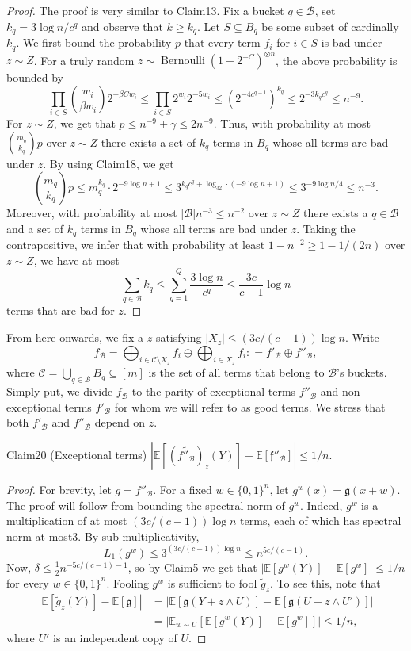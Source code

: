 \begin{proof}
The proof is very similar to Claim13. Fix a bucket $q\in\mathcal B$, set $k_q=3\log n/c^q$ and observe that $k\ge k_q$. Let $S\subseteq B_q$ be some subset of cardinally $k_q$. We first bound the probability $p$ that every term $f_i$ for $i\in S$ is bad under $z\sim Z$.
For a truly random $z\sim\operatorname{Bernoulli}(1-2^{-C})^{\otimes n}$, the above probability is bounded by
\[
\prod_{i\in S}\binom{w_i}{\beta w_i}2^{-\beta Cw_i}
\le\prod_{i\in S}2^{w_i}2^{-5w_i}
\le(2^{-4c^{q-1}})^{k_q}
\le2^{-3k_qc^q}\le n^{-9}.
\]
For $z\sim Z$, we get that $p\le n^{-9}+\gamma\le2n^{-9}$. Thus, with probability at most $\binom{m_q}{k_q}p$ over $z\sim Z$ there exists a set of $k_q$ terms in $B_q$ whose all terms are bad under $z$. By using Claim18, we get
\[
\binom{m_q}{k_q}p\le m_q^{k_q}\cdot2^{-9\log n+1}
\le3^{k_qc^q+\log_32\cdot(-9\log n+1)}
\le3^{-9\log n/4}\le n^{-3}.
\]
Moreover, with probability at most $|\mathcal B|n^{-3}\le n^{-2}$ over $z\sim Z$ there exists a $q\in\mathcal B$ and a set of $k_q$ terms in $B_q$ whose all terms are bad under $z$. Taking the contrapositive, we infer that with probability at least $1-n^{-2}\ge1-1/(2n)$ over $z\sim Z$, we have at most
\[
\sum_{q\in\mathcal B}k_q\le\sum_{q=1}^Q\frac{3\log n}{c^q}\le\frac{3c}{c-1}\log n
\]
terms that are bad for $z$.
\end{proof}
From here onwards, we fix a $z$ satisfying $|X_z|\le(3c/(c-1))\log n$. Write
\[
f_{\mathcal B}=\bigoplus_{i\in\mathcal C\setminus X_z}f_i\oplus\bigoplus_{i\in X_z}f_i
\mathrel{\mathop:}=f'_{\mathcal B}\oplus f''_{\mathcal B},
\]
where $\mathcal C=\bigcup_{q\in\mathcal B}B_q\subseteq[m]$ is the set of all terms that belong to $\mathcal B$'s buckets. Simply put, we divide $f_{\mathcal B}$ to the parity of exceptional terms $f''_{\mathcal B}$ and non-exceptional terms $f'_{\mathcal B}$ for whom we will refer to as good terms. We stress that both $f'_{\mathcal B}$ and $f''_{\mathcal B}$ depend on $z$.
\begin{authorclaim}{Claim20 (Exceptional terms)}
$|\mathbb E[(\widetilde{f''_{\mathcal B}})_z(Y)]-\mathbb E[\mathfrak f''_{\mathcal B}]|\le1/n$.
\end{authorclaim}
\begin{proof}
For brevity, let $g=f''_{\mathcal B}$. For a fixed $w\in\{0,1\}^n$, let $g^w(x)=\mathfrak g(x+w)$. The proof will follow from bounding the spectral norm of $g^w$. Indeed, $g^w$ is a multiplication of at most $(3c/(c-1))\log n$ terms, each of which has spectral norm at most3. By sub-multiplicativity,
\[
L_1(g^w)\le3^{(3c/(c-1))\log n}\le n^{5c/(c-1)}.
\]
Now, $\delta\le\frac12n^{-5c/(c-1)-1}$, so by Claim5 we get that $|\mathbb E[g^w(Y)]-\mathbb E[g^w]|\le1/n$ for every $w\in\{0,1\}^n$.
Fooling $g^w$ is sufficient to fool $\widetilde g_z$. To see this, note that
\begin{align*}
|\mathbb E[\widetilde g_z(Y)]-\mathbb E[\mathfrak g]|
&=|\mathbb E[\mathfrak g(Y+z\wedge U)]-\mathbb E[\mathfrak g(U+z\wedge U')]|\\
&=\left|\mathbb E_{w\sim U}[\mathbb E[g^w(Y)]-\mathbb E[g^w]]\right|\le1/n,
\end{align*}
where $U'$ is an independent copy of $U$.
\end{proof}
